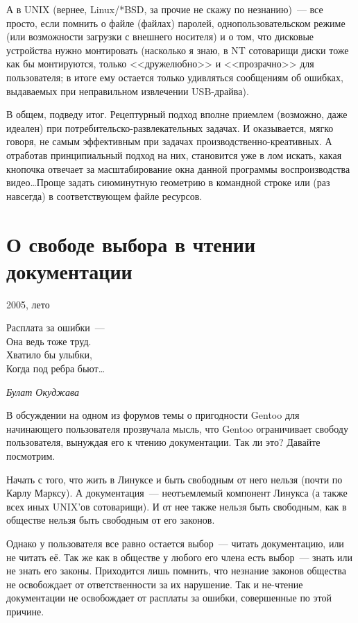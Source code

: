 А в UNIX (вернее, Linux/*BSD, за прочие не скажу по незнанию)~--- все просто, если помнить о файле (файлах) паролей, однопользовательском режиме (или возможности загрузки с внешнего носителя) и о том, что дисковые устройства нужно монтировать (насколько я знаю, в NT сотоварищи диски тоже как бы монтируются, только <<дружелюбно>> и <<прозрачно>> для пользователя; в итоге ему остается только удивляться сообщениям об ошибках, выдаваемых при неправильном извлечении USB-драйва).

В общем, подведу итог. Рецептурный подход вполне приемлем (возможно, даже идеален) при потребительско-развлекательных задачах. И оказывается, мягко говоря, не самым эффективным при задачах производственно-креативных. А отработав принципиальный подход на них, становится уже в лом искать, какая кнопочка отвечает за масштабирование окна данной программы воспроизводства видео\dots Проще задать сиюминутную геометрию в командной строке или (раз навсегда) в соответствующем файле ресурсов.

\section{О свободе выбора в чтении документации} 
\begin{timeline}
2005, лето
\end{timeline}

\hfill \begin{minipage}[h]{0.45\textwidth}
Расплата за ошибки~---\\
Она ведь тоже труд.\\
Хватило бы улыбки,\\
Когда под ребра бьют\dots
\begin{flushright}
\textit{Булат Окуджава}
\end{flushright}\bigskip\end{minipage}

В обсуждении на одном из форумов темы о пригодности Gentoo для начинающего пользователя прозвучала мысль, что Gentoo ограничивает свободу пользователя, вынуждая его к чтению документации. Так ли это? Давайте посмотрим.

Начать с того, что жить в Линуксе и быть свободным от него нельзя (почти по Карлу Марксу). А документация~--- неотъемлемый компонент Линукса (а также всех иных UNIX'ов сотоварищи). И от нее также нельзя быть свободным, как в обществе нельзя быть свободным от его законов.

Однако у пользователя все равно остается выбор~--- читать документацию, или не читать её. Так же как в обществе у любого его члена есть выбор~--- знать или не знать его законы. Приходится лишь помнить, что незнание законов общества не освобождает от ответственности за их нарушение. Так и не-чтение документации не освобождает от расплаты за ошибки, совершенные по этой причине.

